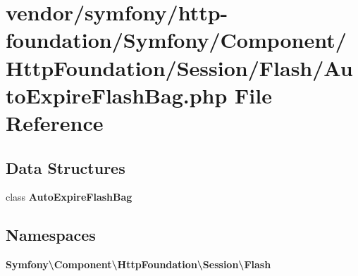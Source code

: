 \section{vendor/symfony/http-\/foundation/\+Symfony/\+Component/\+Http\+Foundation/\+Session/\+Flash/\+Auto\+Expire\+Flash\+Bag.php File Reference}
\label{_auto_expire_flash_bag_8php}
\subsection*{Data Structures}
\begin{DoxyCompactItemize}
\item 
class {\bf Auto\+Expire\+Flash\+Bag}
\end{DoxyCompactItemize}
\subsection*{Namespaces}
\begin{DoxyCompactItemize}
\item 
 {\bf Symfony\textbackslash{}\+Component\textbackslash{}\+Http\+Foundation\textbackslash{}\+Session\textbackslash{}\+Flash}
\end{DoxyCompactItemize}
